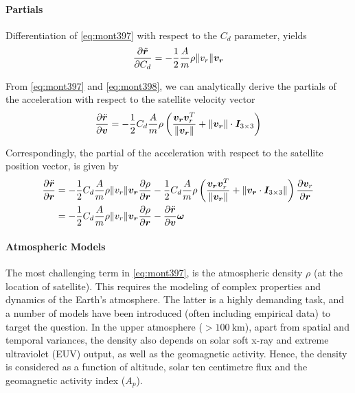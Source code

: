 \paragraph{Partials}\label{par:atmospheric-drag-partials}
Differentiation of \autoref{eq:mont397} with respect to the $C_d$ parameter, yields
\begin{equation}
  \frac{\partial \ddot{\bm{r}}}{\partial C_d} = 
    -\frac{1}{2} \frac{A}{m} \rho \lVert v_r\rVert \bm{v_r}
\end{equation}

From \autoref{eq:mont397} and \autoref{eq:mont398}, we can analytically derive the 
partials of the acceleration with respect to the satellite velocity vector
\begin{equation}
  \frac{\partial \ddot{\bm{r}}}{\partial \bm{v}} = 
  -\frac{1}{2} C_d \frac{A}{m} \rho \left( \frac{\bm{v_r}\bm{v}^T_r}{\lVert\bm{v_r}\rVert} 
    + \lVert\bm{v_r}\rVert \cdot \bm{I}_{3\times 3} \right)
\end{equation}

Correspondingly, the partial of the acceleration with respect to the satellite position 
vector, is given by
\begin{equation}
  \begin{aligned}
    \frac{\partial \ddot{\bm{r}}}{\partial \bm{r}} &= 
    -\frac{1}{2} C_d \frac{A}{m} \rho \lVert v_r\rVert \bm{v_r} \frac{\partial \rho}{\partial \bm{r}}
    -\frac{1}{2} C_d \frac{A}{m} \rho \left( \frac{\bm{v_r}\bm{v}^T_r}{\lVert\bm{v_r}\rVert} 
    + \lVert\bm{v_r} \cdot \bm{I}_{3\times 3}\rVert \right) \frac{\partial \bm{v}_r}{\partial \bm{r}} \\
    & = -\frac{1}{2} C_d \frac{A}{m} \rho \lVert v_r\rVert \bm{v_r} \frac{\partial \rho}{\partial \bm{r}}
      -\frac{\partial \ddot{\bm{r}}}{\partial \bm{v}} \bm{\omega} 
  \end{aligned}
\end{equation}

\paragraph{Atmospheric Models}\label{par:atmospheric-models}
The most challenging term in \ref{eq:mont397}, is the atmospheric density $\rho$ 
(at the location of satellite). This requires the modeling of complex properties 
and dynamics of the Earth's atmosphere. The latter is a highly demanding task, and 
a number of models have been introduced (often including empirical data) to 
target the question. In the upper atmosphere ($>\SI{100}{\km}$), apart from spatial 
and temporal variances, the density also depends on solar soft x-ray and extreme 
ultraviolet (EUV) output, as well as the geomagnetic activity. Hence, the density is 
considered as a function of altitude, solar ten centimetre flux and the geomagnetic 
activity index ($A_p$). 

